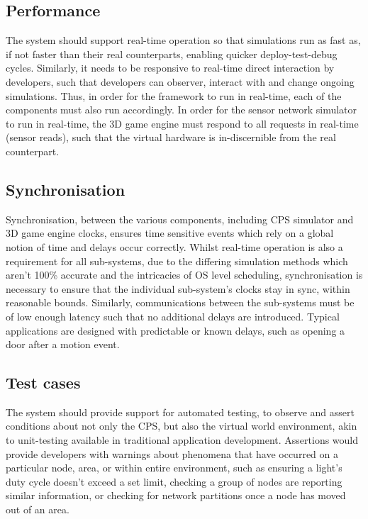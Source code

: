 \subsection{Performance}
\label{sub:requirements_real-time_operation}
The system should support real-time operation so that simulations run as fast as, if not faster than their real counterparts, enabling quicker deploy-test-debug cycles. Similarly, it needs to be responsive to real-time direct interaction by developers, such that developers can observer, interact with and change ongoing simulations. Thus, in order for the framework to run in real-time, each of the components must also run accordingly. In order for the sensor network simulator to run in real-time, the 3D game engine must respond to all requests in real-time (sensor reads), such that the virtual hardware is in-discernible from the real counterpart.

\subsection{Synchronisation}
\label{sub:requirements_synchronisation}
Synchronisation, between the various components, including CPS simulator and 3D game engine clocks, ensures time sensitive events which rely on a global notion of time and delays occur correctly. Whilst real-time operation is also a requirement for all sub-systems, due to the differing simulation methods which aren't 100\% accurate and the intricacies of OS level scheduling, synchronisation is necessary to ensure that the individual sub-system's clocks stay in sync, within reasonable bounds. Similarly, communications between the sub-systems must be of low enough latency such that no additional delays are introduced. Typical applications are designed with predictable or known delays, such as opening a door after a motion event.

\subsection{Test cases}
\label{sub:requirements_test_cases} 
The system should provide support for automated testing, to observe and assert conditions about not only the CPS, but also the virtual world environment, akin to unit-testing available in traditional application development. Assertions would provide developers with warnings about phenomena that have occurred on a particular node, area, or within entire environment, such as ensuring a light's duty cycle doesn't exceed a set limit, checking a group of nodes are reporting similar information, or checking for network partitions once a node has moved out of an area.


